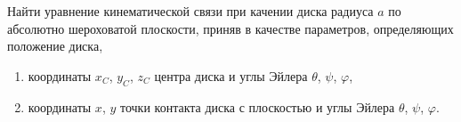 Найти уравнение кинематической связи при качении диска радиуса $a$
по абсолютно шероховатой плоскости, приняв в качестве параметров,
определяющих положение диска,
\begin{enumerate}
\item координаты $x_C$, $y_C$, $z_C$ центра диска
и углы Эйлера $\theta$, $\psi$, $\varphi$,
\item координаты $x$, $y$ точки контакта диска с плоскостью
и углы Эйлера $\theta$, $\psi$, $\varphi$.
\end{enumerate}

